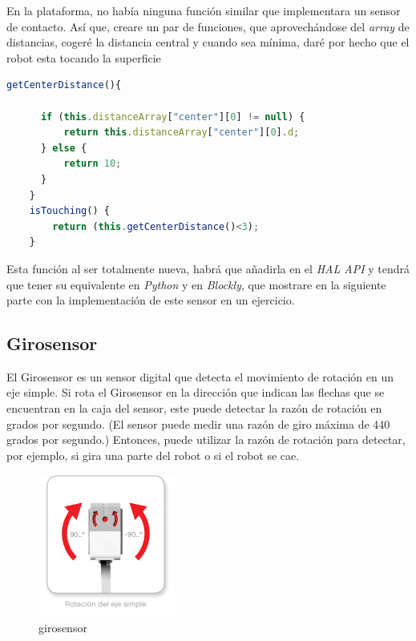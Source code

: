 En la plataforma, no había ninguna función similar que implementara un sensor de contacto. Así que, creare un par de funciones, que aprovechándose del \textit{array} de distancias, cogeré la distancia central y cuando sea mínima, daré por hecho que el robot esta tocando la superficie

   \begin{lstlisting}[language=javascript]
     getCenterDistance(){
      
      if (this.distanceArray["center"][0] != null) {
          return this.distanceArray["center"][0].d;
      } else {
          return 10;
      }
    }
    isTouching() {
        return (this.getCenterDistance()<3);
    }
\end{lstlisting}

Esta función al ser totalmente nueva, habrá que añadirla en el \textit{HAL API} y tendrá que tener su equivalente en \textit{Python} y en \textit{Blockly}, que mostrare en la siguiente parte con la implementación de este sensor en un ejercicio.

\subsection{Girosensor}
El Girosensor es un sensor digital que detecta el movimiento de rotación en un eje simple. Si rota el Girosensor en la dirección que indican las flechas que se encuentran en la caja del sensor, este puede detectar la razón de rotación en grados por segundo. (El sensor puede medir una razón de giro máxima de 440 grados por segundo.) Entonces, puede utilizar la razón de rotación para detectar, por ejemplo, si gira una parte del robot o si el robot se cae.

\begin{figure}
    \centering
    \includegraphics[width=0.5\linewidth]{img/gyrosensor.png}
    \caption{girosensor}
    \label{fig:girosensor}
\end{figure}

